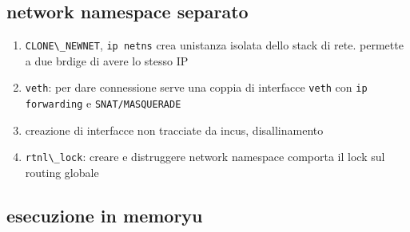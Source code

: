 \subsection{network namespace
separato}\label{network-namespace-separato}

\begin{enumerate}
\def\labelenumi{\arabic{enumi}.}
\tightlist
\item
  \passthrough{\lstinline!CLONE\_NEWNET!},
  \passthrough{\lstinline!ip netns!} crea un\textquotesingle istanza
  isolata dello stack di rete. permette a due brdige di avere lo stesso
  IP
\item
  \passthrough{\lstinline!veth!}: per dare connessione serve una coppia
  di interfacce \passthrough{\lstinline!veth!} con
  \passthrough{\lstinline!ip forwarding!} e
  \passthrough{\lstinline!SNAT/MASQUERADE!}
\item
  creazione di interfacce non tracciate da incus, disallinamento
\item
  \passthrough{\lstinline!rtnl\_lock!}: creare e distruggere network
  namespace comporta il lock sul routing globale
\end{enumerate}

\subsection{esecuzione in memoryu}\label{esecuzione-in-memoryu}

